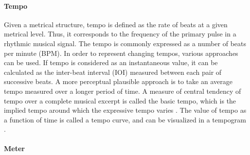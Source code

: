\documentclass{scrartcl}
\begin{document}
\paragraph{Tempo}
Given a metrical structure, tempo is defined as the rate of beats at a given metrical level. Thus, it corresponds to the frequency of the primary pulse in a rhythmic musical signal. The tempo is commonly expressed as a number of beats per minute (BPM). In order to represent changing tempos, various approaches can be used. If tempo is considered as an instantaneous value, it can be calculated as the inter-beat interval (IOI) measured between each pair of successive beats. A more perceptual plausible approach is to take an average tempo measured over a longer period of time. A measure of central tendency of tempo over a complete musical excerpt is called the basic tempo, which is the implied tempo around which the expressive tempo varies \cite{Repp1994}. The value of tempo as a function of time is called a tempo curve, and can be visualized in a tempogram \cite{Cemgil2001}.


\paragraph{Meter} 
\end{document}
